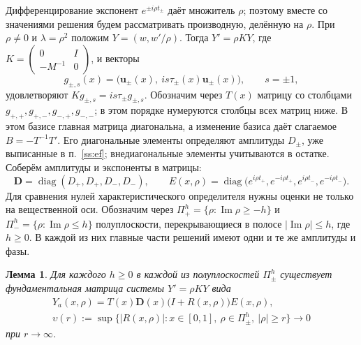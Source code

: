 \documentclass[12pt,a4paper]{article}
\numberwithin{equation}{section}
\newtheorem{lemma}{Лемма}
\theoremstyle{definition}
\newcommand{\abs}[1]{\lvert#1\rvert}
\newcommand{\Imm}{\operatorname{Im}}
\newcommand{\Dd}{\mathbf D}
\begin{document}
Дифференцирование экспонент $e^{\pm i\rho t_\pm}$ даёт множитель $\rho$;
поэтому вместе со значениями решения будем рассматривать производную, делённую на $\rho$.
При $\rho\ne0$ и $\lambda=\rho^2$ положим $Y=(w,w'/\rho)$. Тогда $Y'=\rho KY$, где
$K=\begin{pmatrix}0&I\\-M^{-1}&0\end{pmatrix}$, и векторы
\[
 g_{\pm,s}(x)=\bigl(\mathbf u_\pm(x),\ is\tau_\pm(x)\mathbf u_\pm(x)\bigr),\qquad s=\pm1,
\]
удовлетворяют $Kg_{\pm,s}=is\tau_\pm g_{\pm,s}$. Обозначим через $T(x)$ матрицу со столбцами
$g_{+,+},g_{+,-},g_{-,+},g_{-,-}$; в этом порядке нумеруются столбцы всех матриц ниже.
В этом базисе главная матрица диагональна, а изменение базиса даёт слагаемое
$B=-T^{-1}T'$. Его диагональные элементы определяют амплитуды $D_\pm$, уже выписанные
в п.~\ref{ss:ef}; внедиагональные элементы учитываются в остатке. Соберём амплитуды
и экспоненты в матрицы:
\begin{equation}\label{eq:D}
 \Dd=\operatorname{diag}(D_+,D_+,D_-,D_-),\qquad
 E(x,\rho)=\operatorname{diag}\bigl(e^{i\rho t_+},e^{-i\rho t_+},e^{i\rho t_-},e^{-i\rho t_-}\bigr).
\end{equation}
Для сравнения нулей характеристического определителя нужны оценки не только
на вещественной оси. Обозначим через $\Pi_+^h=\{\rho:\Imm\rho\ge-h\}$ и
$\Pi_-^h=\{\rho:\Imm\rho\le h\}$ полуплоскости, перекрывающиеся в полосе
$\abs{\Imm\rho}\le h$, где $h\ge0$. В каждой из них главные части решений
имеют одни и те же амплитуды и фазы.

\begin{lemma}\label{lem:fsr}
Для каждого $h\ge0$ в каждой из полуплоскостей $\Pi_\pm^h$ существует фундаментальная матрица
системы $Y'=\rho KY$ вида
\begin{equation}\label{eq:fsr}
\begin{gathered}
 Y_a(x,\rho)=T(x)\Dd(x)\bigl(I+R(x,\rho)\bigr)E(x,\rho),\\
 \upsilon(r):=\sup\bigl\{\abs{R(x,\rho)}:x\in[0,1],\ \rho\in\Pi_\pm^h,\ \abs\rho\ge r\bigr\}\to0
\end{gathered}
\end{equation}
при $r\to\infty$.
\end{lemma}
\end{document}
